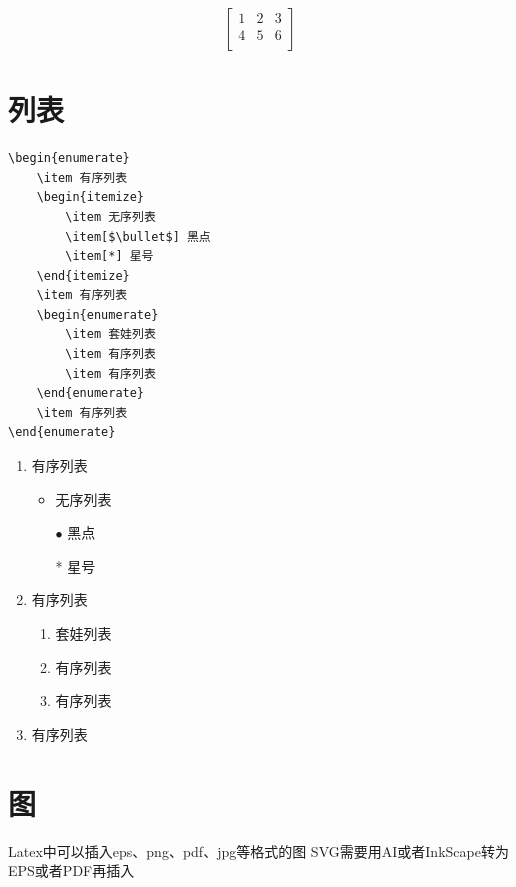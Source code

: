\documentclass{article}
\begin{document}
	\begin{equation}
	\left[
	\begin{array}{ccc}
		1 & 2 & 3\\
		4 & 5 & 6\\
	\end{array}
	\right]
	\end{equation}
	
	\section{列表}
	\begin{lstlisting}
\begin{enumerate}
	\item 有序列表
	\begin{itemize}
		\item 无序列表
		\item[$\bullet$] 黑点
		\item[*] 星号
	\end{itemize}
	\item 有序列表
	\begin{enumerate}
		\item 套娃列表
		\item 有序列表
		\item 有序列表
	\end{enumerate}
	\item 有序列表
\end{enumerate}
	\end{lstlisting}
	\begin{enumerate}
		\item 有序列表
		\begin{itemize}
			\item 无序列表
			\item[$\bullet$] 黑点
			\item[*] 星号
		\end{itemize}
		\item 有序列表
			\begin{enumerate}
			\item 套娃列表
			\item 有序列表
			\item 有序列表
		\end{enumerate}
		\item 有序列表
	\end{enumerate}
	
	
	\section{图}
	Latex中可以插入eps、png、pdf、jpg等格式的图
	SVG需要用AI或者InkScape转为EPS或者PDF再插入
	
\end{document}
